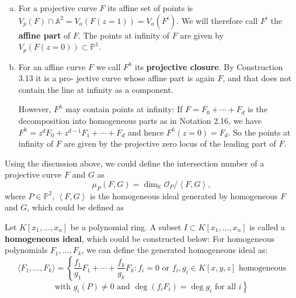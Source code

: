 \documentclass[10pt]{article}
\begin{document}
\begin{construction}
  \begin{enumerate}[(a)]
    \item For a projective curve $F$ its affine set of points is $V_p(F) \cap \mathbb{A}^2 = V_a(F(z = 1)) = V_a(F^i)$.
      We will therefore call $F^i$ the \textbf{affine part} of $F$. The points at infinity of $F$ are given by
      $V_p(F(z = 0)) \subset \mathbb{P}^1$.

    \item For an affine curve $F$ we call $F^h$ its \textbf{projective closure}. By Construction 3.13 it is a pro-
      jective curve whose affine part is again $F$, and that does not contain the line at infinity as a
      component.

      However, $F^h$ may contain points at infinity: If $F = F_0 + \cdots + F_d$ is the decomposition into
      homogeneous parts as in Notation 2.16, we have $F^h = z^d F_0 + z^{d-1} F_1 + \cdots + F_d$ and hence
      $F^h(z = 0) = F_d$. So the points at infinity of $F$ are given by the projective zero locus of the
      leading part of $F$.
  \end{enumerate}
\end{construction}
Using the discussion above, we could define the intersection number of a projective curve $ F$ and $ G$  as
\begin{equation*}
  \mu_{P}(F,G) = \dim_{\mathbb{K}} \mathcal{O}_{P} / \left< F,G \right>,
\end{equation*}
where $ P \in \mathbb{P}^{2}$, $\left< F,G \right>$ is the homogeneous ideal generated by homogeneous $ F$ and $ G$, which could be defined as
\begin{definition}
  Let $K[x_1, \ldots, x_n]$ be a polynomial ring. A subset $I \subset K[x_1, \ldots, x_n]$ is called a \textbf{homogeneous ideal}, which could be constructed below:
  For homogeneous polynomials $F_1, \ldots, F_k$, we can define the generated homogeneous ideal as:
  \begin{equation*}
    \langle F_1, \ldots, F_k \rangle = \left\{ \frac{f_1}{g_1}F_1 + \cdots + \frac{f_k}{g_k}F_k : f_i = 0 \text{ or } f_i, g_i \in K[x, y, z] \text{ homogeneous} \right.
    \end{equation*}
    \begin{equation*}
    \left. \text{with } g_i(P) \neq 0 \text{ and } \deg(f_iF_i) = \deg g_i \text{ for all } i \right\}
  \end{equation*}
\end{definition}
\end{document}
